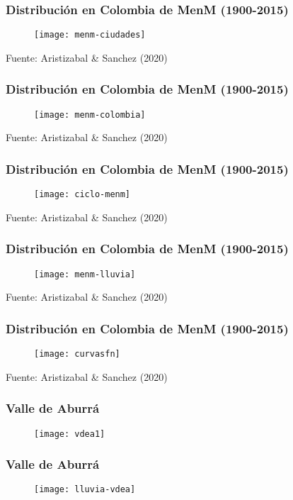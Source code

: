 \documentclass[12pt]{beamer}
\begin{document}
\begin{frame}
\frametitle{Distribución en Colombia de MenM (1900-2015)}
\begin{figure}
\centering
\texttt{[image: menm-ciudades]}
\end{figure}
\tiny{Fuente: Aristizabal \& Sanchez (2020)}
\end{frame}
\begin{frame}
\frametitle{Distribución en Colombia de MenM (1900-2015)}
\begin{figure}
\centering
\texttt{[image: menm-colombia]}
\end{figure}
\tiny{Fuente: Aristizabal \& Sanchez (2020)}
\end{frame}
\begin{frame}
\frametitle{Distribución en Colombia de MenM (1900-2015)}
\begin{figure}
\centering
\texttt{[image: ciclo-menm]}
\end{figure}
\tiny{Fuente: Aristizabal \& Sanchez (2020)}
\end{frame}
\begin{frame}
\frametitle{Distribución en Colombia de MenM (1900-2015)}
\begin{figure}
\centering
\texttt{[image: menm-lluvia]}
\end{figure}
\tiny{Fuente: Aristizabal \& Sanchez (2020)}
\end{frame}
\begin{frame}
\frametitle{Distribución en Colombia de MenM (1900-2015)}
\begin{figure}
\centering
\texttt{[image: curvasfn]}
\end{figure}
\tiny{Fuente: Aristizabal \& Sanchez (2020)}
\end{frame}
\begin{frame}
\frametitle{Valle de Aburrá}
\begin{figure}
\centering
\texttt{[image: vdea1]}
\end{figure}
\end{frame}
\begin{frame}
\frametitle{Valle de Aburrá}
\begin{figure}
\centering
\texttt{[image: lluvia-vdea]}
\end{figure}
\end{frame}
\end{document}
